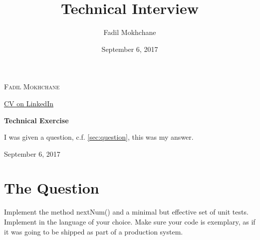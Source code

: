 \documentclass[12pt,a4paper,titlepage]{article}
\title{Technical Interview}
\author{Fadil Mokhchane}
\date{September 6, 2017} %
\begin{document}
\begin{titlepage}
	\centering

	{\scshape\LARGE Fadil Mokhchane \par}
	{\small \href{https://www.linkedin.com/in/fadil/}{CV on LinkedIn} }\par
	\vspace{1cm}

	\vspace{3.5cm}
	{\huge\bfseries Technical Exercise\par}
	\vfill
	{I was given a question, c.f. \autoref{sec:question},
	this was my answer.}
	\vfill

	{%
	\large September 6, 2017\par}
\end{titlepage}

\newpage
\tableofcontents
{}
%
%
%    	
%    	
%    	
%    	
%    	

\newpage
\listoffigures
\listoftables
\vfill
\newpage


\section{The Question} \label{sec:question}
Implement the method nextNum() and a minimal but effective set of unit tests. 
Implement in the language of your choice. 
Make sure your code is exemplary, as if it was going to be shipped as part of a production system.
\end{document}

